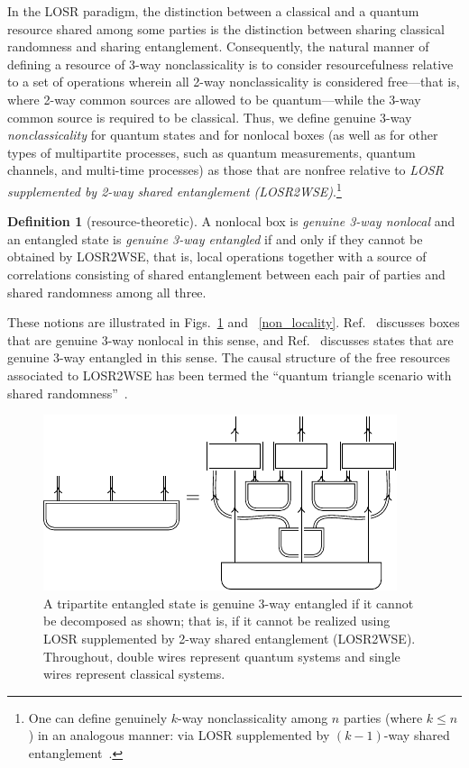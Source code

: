 \documentclass[prx,11pt,letterpaper,twocolumn,accepted=2023-11-27]{quantumarticle}
\theoremstyle{plain}
\theoremstyle{definition}
\newtheorem{defn}{Definition}
\begin{document}
In the LOSR paradigm, the distinction between a classical and a quantum resource shared among some parties is the distinction between sharing classical randomness and sharing entanglement.  
Consequently, the natural manner of defining a resource of 3-way nonclassicality is to consider resourcefulness relative to a set of operations wherein all 2-way nonclassicality is considered free---that is, where 2-way common sources are allowed to be quantum---while the 3-way common source is required to be classical. 
Thus, we define genuine 3-way {\em nonclassicality} for quantum states and for nonlocal boxes (as well as for other types of multipartite processes, such as quantum measurements, quantum channels,  and multi-time processes) as those that are nonfree relative to 
  {\em LOSR supplemented by 2-way shared entanglement (LOSR2WSE)}.\footnote{One can define  genuinely $k$-way nonclassicality among $n$ parties (where $k\leq n$) in an analogous manner: via LOSR supplemented by $(k-1)$-way shared entanglement~\cite{navascues2020genuine}.}     
  \begin{defn}[resource-theoretic]\label{Defn:G3WE}
A nonlocal box is {\em genuine 3-way nonlocal} and an entangled state is {\em genuine 3-way entangled} if and only if they cannot be obtained by LOSR2WSE, that is, local operations together with a source of correlations consisting of shared entanglement between each pair of parties and shared randomness among all three. 
    \end{defn}
   These notions
    are illustrated in Figs.~\ref{genuinely3way} and ~\ref{non_locality}.
Ref.~\cite{wolfe2021infl}  discusses boxes that are genuine 3-way nonlocal in this sense, and Ref.~\cite{navascues2020genuine} discusses states that are genuine 3-way entangled in this sense. The causal structure 
of the free resources
 associated to LOSR2WSE
 has been termed the ``quantum triangle scenario with shared randomness''~\cite{wolfe2021infl,kraft2021quantum}.

\begin{figure}[htb!]
\centering
    \includegraphics[scale=1]{fig_three_way_losr.pdf}
    \caption{
       A tripartite entangled state is genuine 3-way entangled if it cannot be decomposed as shown; that is, if it cannot be realized using LOSR supplemented by 2-way shared entanglement (LOSR2WSE). 
        Throughout, double wires represent quantum systems and single wires represent classical systems. 
    }
    \label{genuinely3way}
\end{figure}
\end{document}
